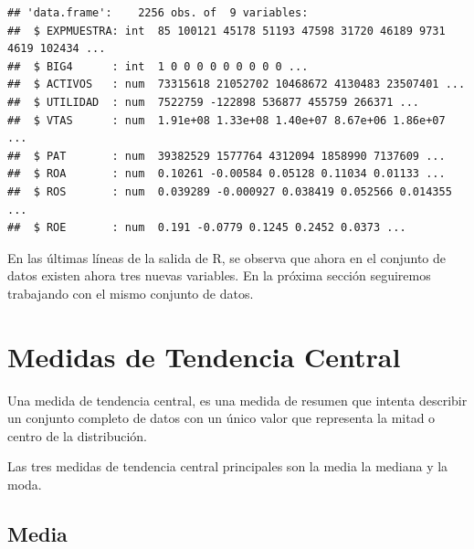 \documentclass[]{book}
\newenvironment{Shaded}{\begin{snugshade}}{\end{snugshade}}
\newcommand{\KeywordTok}[1]{\textcolor[rgb]{0.13,0.29,0.53}{\textbf{#1}}}
\newcommand{\DataTypeTok}[1]{\textcolor[rgb]{0.13,0.29,0.53}{#1}}
\newcommand{\StringTok}[1]{\textcolor[rgb]{0.31,0.60,0.02}{#1}}
\newcommand{\OperatorTok}[1]{\textcolor[rgb]{0.81,0.36,0.00}{\textbf{#1}}}
\newcommand{\NormalTok}[1]{#1}
\begin{document}
\begin{Shaded}
\end{Shaded}

\begin{verbatim}
## 'data.frame':    2256 obs. of  9 variables:
##  $ EXPMUESTRA: int  85 100121 45178 51193 47598 31720 46189 9731 4619 102434 ...
##  $ BIG4      : int  1 0 0 0 0 0 0 0 0 0 ...
##  $ ACTIVOS   : num  73315618 21052702 10468672 4130483 23507401 ...
##  $ UTILIDAD  : num  7522759 -122898 536877 455759 266371 ...
##  $ VTAS      : num  1.91e+08 1.33e+08 1.40e+07 8.67e+06 1.86e+07 ...
##  $ PAT       : num  39382529 1577764 4312094 1858990 7137609 ...
##  $ ROA       : num  0.10261 -0.00584 0.05128 0.11034 0.01133 ...
##  $ ROS       : num  0.039289 -0.000927 0.038419 0.052566 0.014355 ...
##  $ ROE       : num  0.191 -0.0779 0.1245 0.2452 0.0373 ...
\end{verbatim}

En las últimas líneas de la salida de R, se observa que ahora en el
conjunto de datos existen ahora tres nuevas variables. En la próxima
sección seguiremos trabajando con el mismo conjunto de datos.

\section{Medidas de Tendencia
Central}\label{medidas-de-tendencia-central}

Una medida de tendencia central, es una medida de resumen que intenta
describir un conjunto completo de datos con un único valor que
representa la mitad o centro de la distribución.

Las tres medidas de tendencia central principales son la media la
mediana y la moda.

\subsection{Media}\label{media}
\end{document}
